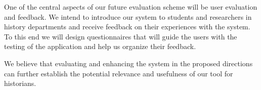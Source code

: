 One of the central aspects of our future evaluation scheme will be user evaluation and feedback. We intend to introduce our system
to students and researchers in history departments and receive feedback on their experiences with the system.
To this end we will design questionnaires that will guide the users with the testing of the application and help us organize their feedback.
 
We believe that evaluating and enhancing the system in the proposed directions can further establish the potential relevance and usefulness 
of our tool for historians.  


